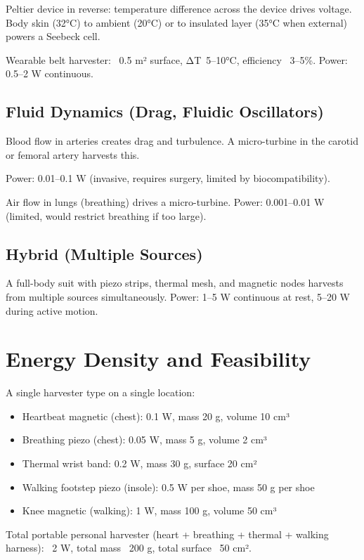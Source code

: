 \documentclass[12pt]{article}
\begin{document}
Peltier device in reverse: temperature difference across the device drives voltage. Body skin (32°C) to ambient (20°C) or to insulated layer (35°C when external) powers a Seebeck cell.

Wearable belt harvester: ~0.5 m² surface, ΔT~5–10°C, efficiency ~3–5\%. Power: 0.5–2 W continuous.

\subsection{Fluid Dynamics (Drag, Fluidic Oscillators)}

Blood flow in arteries creates drag and turbulence. A micro-turbine in the carotid or femoral artery harvests this.

Power: 0.01–0.1 W (invasive, requires surgery, limited by biocompatibility).

Air flow in lungs (breathing) drives a micro-turbine. Power: 0.001–0.01 W (limited, would restrict breathing if too large).

\subsection{Hybrid (Multiple Sources)}

A full-body suit with piezo strips, thermal mesh, and magnetic nodes harvests from multiple sources simultaneously. Power: 1–5 W continuous at rest, 5–20 W during active motion.

\section{Energy Density and Feasibility}

A single harvester type on a single location:

\begin{itemize}
\item Heartbeat magnetic (chest): 0.1 W, mass 20 g, volume 10 cm³
\item Breathing piezo (chest): 0.05 W, mass 5 g, volume 2 cm³
\item Thermal wrist band: 0.2 W, mass 30 g, surface 20 cm²
\item Walking footstep piezo (insole): 0.5 W per shoe, mass 50 g per shoe
\item Knee magnetic (walking): 1 W, mass 100 g, volume 50 cm³
\end{itemize}

Total portable personal harvester (heart + breathing + thermal + walking harness): ~2 W, total mass ~200 g, total surface ~50 cm².
\end{document}
